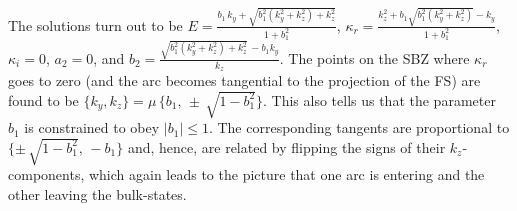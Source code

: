 \documentclass[aps,prb,onecolumn, footinbib, 10pt]{revtex4-2}
\begin{document}
The solutions turn out to be
$E = \frac{ b_1 \,k_y + \sqrt{b_1^2 \left(k_y^2+k_z^2\right)+k_z^2}} { 1 + b_1^2  }$,
$\kappa_r = \frac{ k_z^2 + b_1 \sqrt{b_1^2 \left(k_y^2+k_z^2\right) }-k_y}{ 1 + b_1^2}$, $\kappa_i  = 0 $,
$a_2 = 0 $, and $b_2  =  \frac{\sqrt{b_1^2 \left(k_y^2+k_z^2\right)+k_z^2}\,-b_1 k_y}{k_z}$. The points on the SBZ where $\kappa_r$ goes to zero (and the arc becomes tangential to the projection of the FS) are found to be $\lbrace k_y, k_z \rbrace = \mu \,\lbrace b_1 , \, \pm\, \sqrt{1-b_1^2}\rbrace $. This also tells us that the parameter $b_1$ is constrained to obey $|b_1|\leq 1 $. 
The corresponding tangents are proportional to $ \lbrace \pm\,\sqrt{1-b_1^2} , \, -b_1\rbrace $ and, hence, are related by flipping the signs of their $k_z$-components, which again leads to the picture that one arc is entering and the other leaving the bulk-states. 
\end{document}
